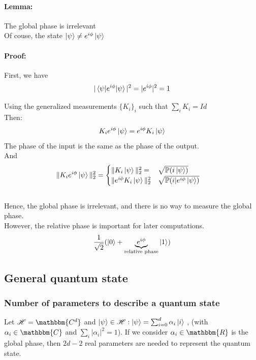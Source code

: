 \documentclass{article}
\begin{document}
\paragraph{Lemma: }
The global phase is irrelevant\\
Of couse, the state $\ket{\psi} \neq e^{i\phi}\ket{\psi}$

\paragraph{Proof: }
First, we have
\begin{equation}
    |\braket{\psi|e^{i\phi}|\psi}|^2 = |e^{i\phi}|^2 = 1
\end{equation}

Using the generalized measurements $\{K_i\}_i$ such that $\sum_i K_i = Id$
\\\noindent
Then:
\begin{equation}
    K_ie^{i\phi}\ket{\psi} = e^{i\phi}K_i\ket{\psi}
\end{equation}
\noindent
The phase of the input is the same as the phase of the output.
\\\noindent
And
\begin{equation}
    \begin{aligned}
        \|K_ie^{i\phi}\ket{\psi}\|^2_2
            & =\begin{cases}
               \| K_i \ket{\psi} \|_2^2 = & \sqrt{ \mathbb{P}(i\ket{\psi})} \\
               \|e^{i\phi} K_i\ket{\psi}\|_2^2 & \sqrt{\mathbb{P}(i|e^{i\phi}\ket{\psi})}
            \end{cases}
    \end{aligned}
\end{equation}
\\\noindent
Hence, the global phase is irrelevant, and there is no way to measure the global phase.
\\\noindent
However, the relative phase is important for later computations.
\begin{equation}
    \frac{1}{\sqrt{2}}(\ket{0}+\underbrace{e^{i\phi}}_{\text{relative phase}}\ket{1})
\end{equation}

\subsection{General quantum state}
\subsubsection*{Number of parameters to describe a quantum state}
Let $\mathscr{H} = \mathbbm{C^d}$ and $\ket{\psi} \in \mathscr{H}: \ket{\psi} = \sum_{i=0}^d \alpha_i \ket{i}$
, (with $\alpha_i \in \mathbbm{C}$ and $\sum_i |\alpha_i|^2=1$). If we consider $\alpha_i \in \mathbbm{R}$
is the global phase, then $2d-2$ real parameters are needed to represent the quantum state.
\end{document}

